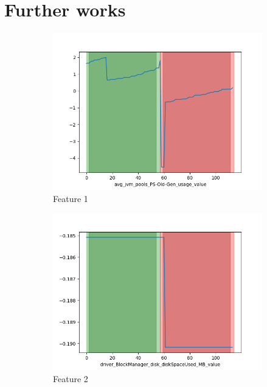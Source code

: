 \documentclass[oneside, a4paper, onecolumn, 11pt]{article}
\begin{document}
\section{Further works}
\begin{figure}[H]
  \centering
  \begin{subfigure}{0.30\textwidth}
      \centering
      \includegraphics[width=\linewidth]{images/ex0.png}
      \caption{Feature 1}
  \end{subfigure}
  \begin{subfigure}{0.30\textwidth}
      \centering
      \includegraphics[width=\linewidth]{images/ex1.png}
      \caption{Feature 2}
  \end{subfigure}
  \begin{subfigure}{0.30\textwidth}

\end{subfigure}
\end{figure}
\end{document}
